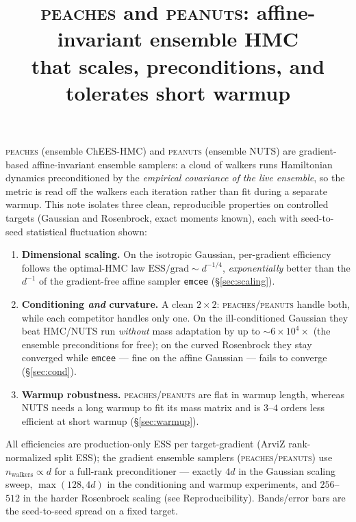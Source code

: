 \documentclass[11pt]{article}
\title{\textsc{peaches} and \textsc{peanuts}: affine-invariant ensemble HMC\\
that scales, preconditions, and tolerates short warmup}
\author{}
\date{}
\begin{document}
\maketitle

\noindent
\textsc{peaches} (ensemble ChEES-HMC) and \textsc{peanuts} (ensemble NUTS)
are gradient-based affine-invariant ensemble samplers: a cloud of walkers
runs Hamiltonian dynamics preconditioned by the \emph{empirical covariance
of the live ensemble}, so the metric is read off the walkers each iteration
rather than fit during a separate warmup. This note isolates three clean,
reproducible properties on controlled targets (Gaussian and Rosenbrock,
exact moments known), each with seed-to-seed statistical fluctuation shown:

\begin{enumerate}
\item \textbf{Dimensional scaling.} On the isotropic Gaussian, per-gradient
efficiency follows the optimal-HMC law $\text{ESS}/\text{grad}\sim d^{-1/4}$,
\emph{exponentially} better than the $d^{-1}$ of the gradient-free affine
sampler \texttt{emcee} (\S\ref{sec:scaling}).
\item \textbf{Conditioning \emph{and} curvature.} A clean $2\times2$:
\textsc{peaches}/\textsc{peanuts} handle both, while each competitor handles
only one. On the ill-conditioned Gaussian they beat HMC/NUTS run \emph{without}
mass adaptation by up to $\sim\!6\!\times\!10^4\times$ (the ensemble preconditions for
free); on the curved Rosenbrock they stay converged while \texttt{emcee} ---
fine on the affine Gaussian --- fails to converge (\S\ref{sec:cond}).
\item \textbf{Warmup robustness.} \textsc{peaches}/\textsc{peanuts} are flat in
warmup length, whereas NUTS needs a long warmup to fit its mass matrix and is
$3$--$4$ orders less efficient at short warmup (\S\ref{sec:warmup}).
\end{enumerate}

All efficiencies are production-only ESS per target-gradient (ArviZ
rank-normalized split ESS); the gradient ensemble samplers
(\textsc{peaches}/\textsc{peanuts}) use $n_{\text{walkers}}\propto d$ for a
full-rank preconditioner --- exactly $4d$ in the Gaussian scaling sweep,
$\max(128,4d)$ in the conditioning and warmup experiments, and $256$--$512$ in
the harder Rosenbrock scaling (see Reproducibility). Bands/error bars are the
seed-to-seed spread on a fixed target.

\end{document}
